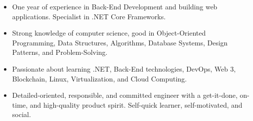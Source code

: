 





\begin{itemize}
    \item One year of experience in Back-End Development and building web applications. Specialist in .NET Core Frameworks.
    \item Strong knowledge of computer science, good in Object-Oriented Programming, Data Structures, Algorithms, Database Systems, Design Patterns, and Problem-Solving.
    \item Passionate about learning .NET, Back-End technologies, DevOps, Web 3, Blockchain, Linux, Virtualization, and Cloud Computing.
    \item Detailed-oriented, responsible, and committed engineer with a get-it-done, on-time, and high-quality product spirit. Self-quick learner, self-motivated, and social.
\end{itemize}
